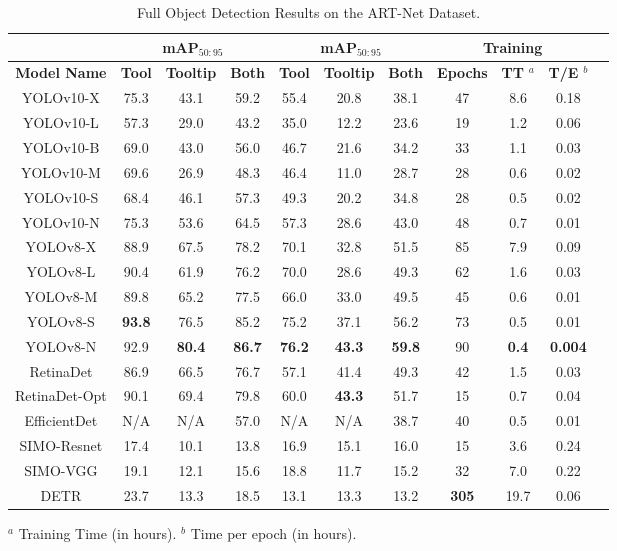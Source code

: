 \begin{table*}[h]
\centering
\caption{Full Object Detection Results on the ART-Net Dataset.}
\label{fig:artresults}
\begin{tabular}{|c|c|c|c|c|c|c|c|c|c|c|}
\hline
\multicolumn{1}{|c|}{} & \multicolumn{3}{c|}{\textbf{mAP$_{50:95}$}} & \multicolumn{3}{c|}{\textbf{mAP$_{50:95}$}} & \multicolumn{3}{c|}{\textbf{Training}} \\
\hline
\textbf{Model Name} & \textbf{Tool} & \textbf{Tooltip} & \textbf{Both} & \textbf{Tool} & \textbf{Tooltip} & \textbf{Both} & \textbf{Epochs} & \textbf{TT} $^a$ & \textbf{T/E} $^b$ \\ 
\hline
YOLOv10-X & 75.3 & 43.1 & 59.2 & 55.4 & 20.8 & 38.1 & 47 & 8.6 & 0.18 \\ 
YOLOv10-L & 57.3 & 29.0 & 43.2 & 35.0 & 12.2 & 23.6 & 19 & 1.2 & 0.06 \\ 
YOLOv10-B & 69.0 & 43.0 & 56.0 & 46.7 & 21.6 & 34.2 & 33 & 1.1 & 0.03 \\ 
YOLOv10-M & 69.6 & 26.9 & 48.3 & 46.4 & 11.0 & 28.7 & 28 & 0.6 & 0.02 \\ 
YOLOv10-S & 68.4 & 46.1 & 57.3 & 49.3 & 20.2 & 34.8 & 28 & 0.5 & 0.02 \\ 
YOLOv10-N & 75.3 & 53.6 & 64.5 & 57.3 & 28.6 & 43.0 & 48 & 0.7 & 0.01 \\ 
YOLOv8-X & 88.9 & 67.5 & 78.2 & 70.1 & 32.8 & 51.5 & 85 & 7.9 & 0.09 \\ 
YOLOv8-L & 90.4 & 61.9 & 76.2 & 70.0 & 28.6 & 49.3 & 62 & 1.6 & 0.03 \\ 
YOLOv8-M & 89.8 & 65.2 & 77.5 & 66.0 & 33.0 & 49.5 & 45 & 0.6 & 0.01 \\ 
YOLOv8-S & \textbf{93.8} & 76.5 & 85.2 & 75.2 & 37.1 & 56.2 & 73 & 0.5 & 0.01 \\ 
YOLOv8-N & 92.9 & \textbf{80.4} & \textbf{86.7} & \textbf{76.2} & \textbf{43.3} & \textbf{59.8} & 90 & \textbf{0.4} & \textbf{0.004} \\ 
RetinaDet & 86.9 & 66.5 & 76.7 & 57.1 & 41.4 & 49.3 & 42 & 1.5 & 0.03 \\ 
RetinaDet-Opt & 90.1 & 69.4 & 79.8 & 60.0 & \textbf{43.3} & 51.7 & 15 & 0.7 & 0.04 \\ 
EfficientDet & N/A & N/A & 57.0 & N/A & N/A & 38.7 & 40 & 0.5 & 0.01 \\ 
SIMO-Resnet & 17.4 & 10.1 & 13.8 & 16.9 & 15.1 & 16.0 & 15 & 3.6 & 0.24 \\ 
SIMO-VGG & 19.1 & 12.1 & 15.6 & 18.8 & 11.7 & 15.2 & 32 & 7.0 & 0.22 \\ 
DETR & 23.7 & 13.3 & 18.5 & 13.1 & 13.3 & 13.2 & \textbf{305} & 19.7 & 0.06 \\ 
\hline
\end{tabular}
\newline
\footnotesize{$^a$ Training Time (in hours). $^b$ Time per epoch (in hours).}
\end{table*}

